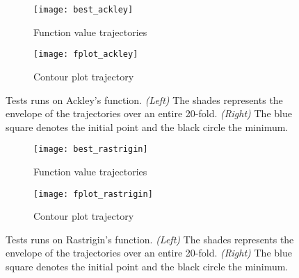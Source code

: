 {		\begin{figure}[h!]
			\centering
			\begin{subfigure}[b]{0.45\linewidth}
			{
				\centering
				\texttt{[image: best\_ackley]}
				\caption{Function value trajectories}
				\label{fig::ackley_eval}
			}
			\end{subfigure}
			\hfill
			\begin{subfigure}[b]{0.45\linewidth}
			{
				\centering
				\texttt{[image: fplot\_ackley]}
				\caption{Contour plot trajectory}
				\label{fig::ackley_eval_traj}
			}
			\end{subfigure}
		\caption[Tests runs on Ackley's function]{Tests runs on Ackley's function. \emph{(Left)} The shades represents the envelope of the trajectories over an entire 20-fold. \emph{(Right)} The blue square denotes the initial point and the black circle the minimum.}
		\label{fig::ackleys}
		\end{figure}
		
		\begin{figure}[h!]
			\centering
			\begin{subfigure}[b]{0.45\linewidth}
			{
				\centering
				\texttt{[image: best\_rastrigin]}
				\caption{Function value trajectories}
				\label{fig::rastrigin_eval}
			}
			\end{subfigure}
			\hfill
			\begin{subfigure}[b]{0.45\linewidth}
			{
				\centering
				\texttt{[image: fplot\_rastrigin]}
				\caption{Contour plot trajectory}
				\label{fig::rastrigin_eval_traj}
			}
			\end{subfigure}
		\caption[Tests runs on Rastrigin's function]{Tests runs on Rastrigin's function. \emph{(Left)} The shades represents the envelope of the trajectories over an entire 20-fold. \emph{(Right)} The blue square denotes the initial point and the black circle the minimum.}
		\label{fig::rastrigins}
		\end{figure}
		
	}
	
	
